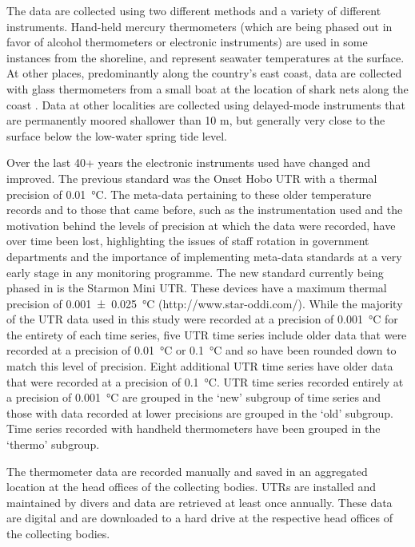 \documentclass{ametsoc}
\begin{document}
The data are collected using two different methods and a variety of different instruments. Hand-held mercury thermometers (which are being phased out in favor of alcohol thermometers or electronic instruments) are used in some instances from the shoreline, and represent seawater temperatures at the surface. At other places, predominantly along the country's east coast, data are collected with glass thermometers from a small boat at the location of shark nets along the coast \citep{Cliff1988}. Data at other localities are collected using delayed-mode instruments that are permanently moored shallower than 10 m, but generally very close to the surface below the low-water spring tide level.

Over the last 40+ years the electronic instruments used have changed and improved. The previous standard was the Onset Hobo UTR with a thermal precision of \SI{0.01}{\degreeCelsius}. The meta-data pertaining to these older temperature records and to those that came before, such as the instrumentation used and the motivation behind the levels of precision at which the data were recorded, have over time been lost, highlighting the issues of staff rotation in government departments and the importance of implementing meta-data standards at a very early stage in any monitoring programme. The new standard currently being phased in is the Starmon Mini UTR. These devices have a maximum thermal precision of \SI[separate-uncertainty = true, multi-part-units = repeat]{0.001(25)}{\degreeCelsius} (http://www.star-oddi.com/). While the majority of the UTR data used in this study were recorded at a precision of \SI{0.001}{\degreeCelsius} for the entirety of each time series, five UTR time series include older data that were recorded at a precision of \SI{0.01}{\degreeCelsius} or \SI{0.1}{\degreeCelsius} and so have been rounded down to match this level of precision. Eight additional UTR time series have older data that were recorded at a precision of \SI{0.1}{\degreeCelsius}. UTR time series recorded entirely at a precision of \SI{0.001}{\degreeCelsius} are grouped in the `new' subgroup of time series and those with data recorded at lower precisions are grouped in the `old' subgroup. Time series recorded with handheld thermometers have been grouped in the `thermo' subgroup.

The thermometer data are recorded manually and saved in an aggregated location at the head offices of the collecting bodies. UTRs are installed and maintained by divers and data are retrieved at least once annually. These data are digital and are downloaded to a hard drive at the respective head offices of the collecting bodies.
\end{document}

